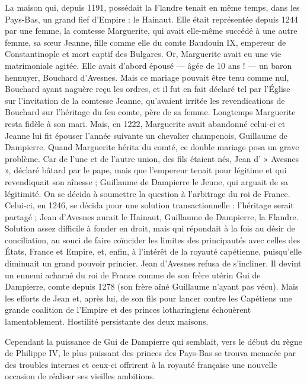 \documentclass[french,twoside]{book} %
\begin{document}
\label{p24} La maison qui, depuis 1191, possédait la Flandre tenait en même temps, dans les Pays-Bas, un grand fief d’Empire : le Hainaut. Elle était représentée depuis 1244 par une femme, la comtesse Marguerite, qui avait elle-même succédé à une autre femme, sa sœur Jeanne, fille comme elle du comte Baudouin IX, empereur de Constantinople et mort captif des Bulgares. Or, Marguerite avait eu une vie matrimoniale agitée. Elle avait d’abord épousé — âgée de 10 ans ! — un baron hennuyer, Bouchard d’Avesnes. Mais ce mariage pouvait être tenu comme nul, Bouchard ayant naguère reçu les ordres, et il fut en fait déclaré tel par l’Église sur l’invitation de la comtesse Jeanne, qu’avaient irritée les revendications de Bouchard sur l’héritage du feu comte, père de sa femme. Longtemps Marguerite resta fidèle à son mari. Mais, en 1222, Marguerite avait abandonné celui-ci et Jeanne lui fit épouser l’année suivante un chevalier champenois, Guillaume de Dampierre. Quand Marguerite hérita du comté, ce double mariage posa un grave problème. Car de l’une et de l’autre union, des fils étaient nés, Jean d’ » Avesnes », déclaré bâtard par le pape, mais que l’empereur tenait pour légitime et qui revendiquait son aînesse ; Guillaume de Dampierre le Jeune, qui arguait de sa légitimité. On se décida à soumettre la question à l’arbitrage du roi de France. Celui-ci, en 1246, se décida pour une solution transactionnelle : l’héritage serait partagé ; Jean d’Avesnes aurait le Hainaut, Guillaume de Dampierre, la Flandre. Solution assez difficile à fonder en droit, mais qui répondait à la fois au désir de conciliation, au souci de faire coïncider les limites des principautés avec celles des États, France et Empire, et, enfin, à l’intérêt de la royauté capétienne, puisqu’elle diminuait un grand pouvoir princier. Jean d’Avesnes refusa de s’incliner. Il devint un ennemi acharné du roi de France comme de son frère utérin Gui de Dampierre, comte depuis 1278 (son frère aîné Guillaume n’ayant pas vécu). Mais les efforts de Jean et, après lui, de son fils pour lancer contre les Capétiens une grande coalition de l’Empire et des princes lotharingiens échouèrent lamentablement. Hostilité persistante des deux maisons.\par
Cependant la puissance de Gui de Dampierre qui semblait, vers le début du règne de Philippe IV, le plus puissant des princes des Pays-Bas se trouva menacée par des troubles internes et ceux-ci offrirent à la royauté française une nouvelle occasion de réaliser ses vieilles ambitions.\par
\end{document}
